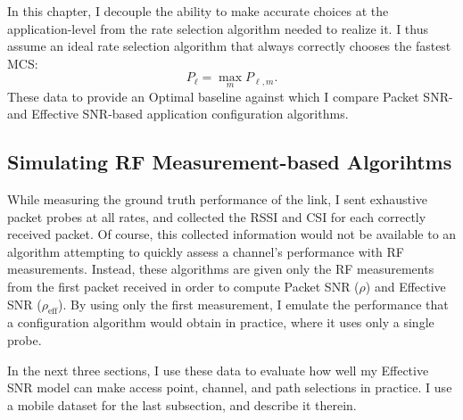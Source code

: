 In this chapter, I decouple the ability to make accurate choices at the application-level from the rate selection algorithm needed to realize it. I thus assume an ideal rate selection algorithm that always correctly chooses the fastest MCS:
\begin{equation}
	\label{eq:best_throughput}
	P_\ell = \max_m P_{\ell,m}.
\end{equation}
These data to provide an Optimal baseline against which I compare Packet SNR- and Effective SNR-based application configuration algorithms.

\subsection{Simulating RF Measurement-based Algorihtms}
While measuring the ground truth performance of the link, I sent exhaustive packet probes at all rates, and collected the RSSI and CSI for each correctly received packet. Of course, this collected information would not be available to an algorithm attempting to quickly assess a channel's performance with RF measurements. Instead, these algorithms are given only the RF measurements from the first packet received in order to compute Packet SNR ($\rho$) and Effective SNR ($\rho_\text{eff}$). By using only the first measurement, I emulate the performance that a configuration algorithm would obtain in practice, where it uses only a single probe.

In the next three sections, I use these data to evaluate how well my Effective SNR model can make access point, channel, and path selections in practice. I use a mobile dataset for the last subsection, and describe it therein.
